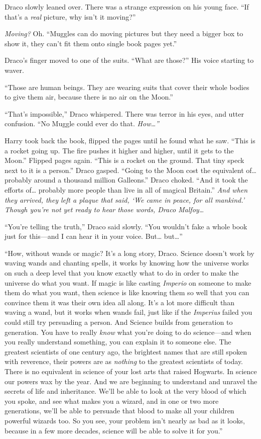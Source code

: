 Draco slowly leaned over. There was a strange expression on his young
face. ``If that's a \emph{real} picture, why isn't it moving?''

\emph{Moving?} Oh. ``Muggles can do moving pictures but they need a
bigger box to show it, they can't fit them onto single book pages yet.''

Draco's finger moved to one of the suits. ``What are those?'' His voice
starting to waver.

``Those are human beings. They are wearing suits that cover their whole
bodies to give them air, because there is no air on the Moon.''

``That's impossible,'' Draco whispered. There was terror in his eyes,
and utter confusion. ``No Muggle could ever do that.
\emph{How\ldots{}''}

Harry took back the book, flipped the pages until he found what he saw.
``This is a rocket going up. The fire pushes it higher and higher, until
it gets to the Moon.'' Flipped pages again. ``This is a rocket on the
ground. That tiny speck next to it is a person.'' Draco gasped. ``Going
to the Moon cost the equivalent of\ldots{} probably around a thousand
million Galleons.'' Draco choked. ``And it took the efforts of\ldots{}
probably more people than live in all of magical Britain.'' \emph{And
when they arrived, they left a plaque that said, `We came in peace, for
all mankind.' Though you're not yet ready to hear those words, Draco
Malfoy\ldots{}}

``You're telling the truth,'' Draco said slowly. ``You wouldn't fake a
whole book just for this---and I can hear it in your voice. But\ldots{}
but\ldots{}''

``How, without wands or magic? It's a long story, Draco. Science doesn't
work by waving wands and chanting spells, it works by knowing how the
universe works on such a deep level that you know exactly what to do in
order to make the universe do what you want. If magic is like casting
\emph{Imperio} on someone to make them do what you want, then science is
like knowing them so well that you can convince them it was their own
idea all along. It's a lot more difficult than waving a wand, but it
works when wands fail, just like if the \emph{Imperius} failed you could
still try persuading a person. And Science builds from generation to
generation. You have to really \emph{know} what you're doing to do
science---and when you really understand something, you can explain it
to someone else. The greatest scientists of one century ago, the
brightest names that are still spoken with reverence, their powers are
as \emph{nothing} to the greatest scientists of today. There is no
equivalent in science of your lost arts that raised Hogwarts. In science
our powers wax by the year. And we are beginning to understand and
unravel the secrets of life and inheritance. We'll be able to look at
the very blood of which you spoke, and see what makes you a wizard, and
in one or two more generations, we'll be able to persuade that blood to
make all your children powerful wizards too. So you see, your problem
isn't nearly as bad as it looks, because in a few more decades, science
will be able to solve it for you.''

